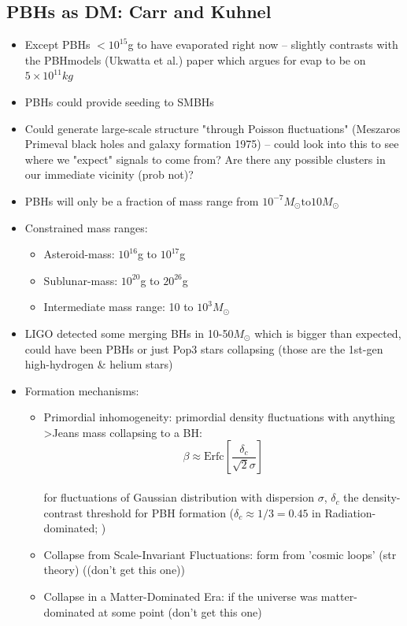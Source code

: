 \documentclass[12pt]{article}
\begin{document}
\subsection{PBHs as DM: Carr and Kuhnel}
\begin{itemize}
    \item Except PBHs $<10^15$g to have evaporated right now -- slightly contrasts with the PBHmodels (Ukwatta et al.) paper which argues for evap to be on $5\times10^11kg$
    \item PBHs could provide seeding to SMBHs
    \item Could generate large-scale structure "through Poisson fluctuations" (Meszaros Primeval black holes and galaxy formation 1975) -- could look into this to see where we "expect" signals to come from? Are there any possible clusters in our immediate vicinity (prob not)?
    \item PBHs will only be a fraction of mass range from $10^{-7} M_\odot \mbox{to} 10 M_\odot$
    \item Constrained mass ranges:
    \begin{itemize}
        \item Asteroid-mass: $10^16$g to $10^17$g
        \item Sublunar-mass: $10^20$g to $20^26$g
        \item Intermediate mass range: 10 to $10^3 M_\odot$
    \end{itemize}
    \item LIGO detected some merging BHs in 10-50$M_\odot$ which is bigger than expected, could have been PBHs or just Pop3 stars collapsing (those are the 1st-gen high-hydrogen \& helium stars)
    \item Formation mechanisms:
    \begin{itemize}
        \item Primordial inhomogeneity: primordial density fluctuations with anything >Jeans mass collapsing to a BH: $$\beta \approx \mbox{Erfc}[\frac{\delta_c}{\sqrt{2}\sigma}]$$\\for fluctuations of Gaussian distribution with dispersion $\sigma$, $\delta_c$ the density-contrast threshold for PBH formation ($\delta_c\approx 1/3 = 0.45$ in Radiation-dominated; )
        \item Collapse from Scale-Invariant Fluctuations: form from 'cosmic loops' (str theory) ((don't get this one))
        \item Collapse in a Matter-Dominated Era: if the universe was matter-dominated at some point (don't get this one)

\end{itemize}
\end{itemize}
\end{document}
